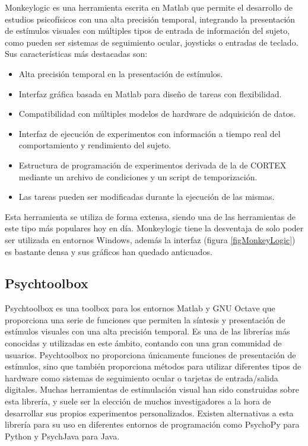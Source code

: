 \documentclass[conference]{IEEEtran}
\begin{document}
Monkeylogic\cite{monkeylogic} es una herramienta escrita en  Matlab que permite el desarrollo de estudios psicofísicos con una alta precisión temporal, integrando la presentación de estímulos visuales con múltiples tipos de entrada de información del sujeto, como pueden ser sistemas de seguimiento ocular, joysticks o entradas de teclado.
Sus características más destacadas son:
\begin{itemize}
	\item Alta precisión temporal en la presentación de estímulos. 
	\item Interfaz gráfica basada en Matlab para diseño de tareas con flexibilidad.
	\item Compatibilidad con múltiples modelos de hardware de adquisición de datos.
	\item Interfaz de ejecución de experimentos con información a tiempo real del comportamiento y rendimiento del sujeto.
	\item Estructura de programación de experimentos derivada de la de CORTEX\cite{cortex} mediante un archivo de condiciones y un script de temporización.
	\item Las tareas pueden ser modificadas durante la ejecución de las mismas.
\end{itemize}
Esta herramienta se utiliza de forma extensa, siendo una de las herramientas de este tipo más populares hoy en día.
Monkeylogic tiene la desventaja de solo poder ser utilizada en entornos Windows, además la interfaz (figura \ref{figMonkeyLogic}) es bastante densa y sus gráficos han quedado anticuados.

\subsection{Psychtoolbox}

Psychtoolbox\cite{psychtoolbox} es una toolbox para los entornos Matlab y GNU Octave que proporciona una serie de funciones que permiten la síntesis y presentación de estímulos visuales con una alta precisión temporal. 
Es una de las librerías más conocidas y utilizadas en este ámbito, contando con una gran comunidad de usuarios.
Psychtoolbox no proporciona únicamente funciones de presentación de estímulos, sino que también proporciona métodos para utilizar diferentes tipos de hardware como sistemas de seguimiento ocular o tarjetas de entrada/salida digitales.
Muchas herramientas de estimulación visual \cite{opticka}\cite{wave} han sido construidas sobre esta librería, y suele ser la elección de muchos investigadores a la hora de desarrollar sus propios experimentos personalizados.
Existen alternativas a esta librería para su uso en diferentes entornos de programación como PsychoPy\cite{psychopy} para Python y PsychJava para Java.
\end{document}
